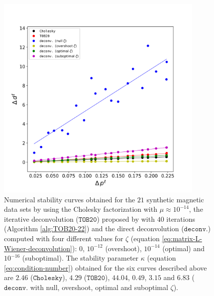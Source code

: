 \begin{figure}[htbp]
	\begin{center}
			\includegraphics[width=10cm]{Fig/stability_mag}
		\end{center}
	\caption{
		Numerical stability curves obtained for the $21$ synthetic magnetic data sets 
		by using the Cholesky factorization with $\mu \approx 10^{-14}$, the iterative deconvolution
		($\mathtt{TOB20}$) proposed by \citet{takahashi-etal2022} with $40$ iterations (Algorithm \ref{alg:TOB20-22}) 
		and the direct deconvolution ($\mathtt{deconv.}$) computed with four different values for $\zeta$ 
		(equation \ref{eq:matrix-L-Wiener-deconvolution}): $0$, $10^{-12}$ (overshoot), $10^{-14}$ (optimal)
		and $10^{-16}$ (suboptimal).
		The stability parameter $\kappa$ (equation \ref{eq:condition-number}) obtained for the six curves
		described above are $2.46$ ($\mathtt{Cholesky}$), $4.29$ ($\mathtt{TOB20}$), $44.04$, $0.49$, $3.15$ and $6.83$ ($\mathtt{deconv.}$ with null, overshoot, optimal and suboptimal $\zeta$).
		}
	\label{fig:6}
\end{figure}

